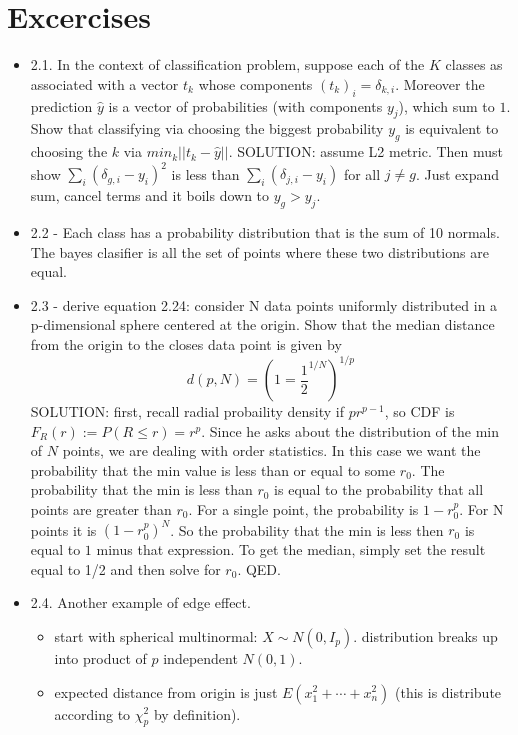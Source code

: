 \documentclass[a4paper]{report}
\newcommand{\<}{\textless}
\renewcommand{\>}{\textgreater}
\begin{document}
\section{Excercises}
\begin{itemize}
  \item 2.1. In the context of classification problem, suppose each of the $K$ classes as associated with a vector $t_k$ whose components $(t_k)_i = \delta_{k,i}$. Moreover the prediction $\hat{y}$ is a vector of probabilities (with components $y_j$), which sum to $1$. Show that classifying via choosing the biggest probability $y_g$ is equivalent to choosing the $k$ via $min_k || t_k - \hat{y} ||$.
    \subitem SOLUTION: assume L2 metric. Then must show $\sum_i (\delta_{g,i} - y_i)^2$ is less than $\sum_i (\delta_{j,i} - y_i)$ for all $j \neq g$. Just expand sum, cancel terms and it boils down to $y_g > y_j$.
  \item 2.2 - Each class has a probability distribution that is the sum of 10 normals. The bayes clasifier is all the set of points where these two distributions are equal.
  \item 2.3 - derive equation 2.24: consider N data points uniformly distributed in a p-dimensional sphere centered at the origin. Show that the median distance from the origin to the closes data point is given by
    $$ d(p, N) = \left(1 = \frac{1}{2}^{1/N}\right)^{1/p} $$
    \subitem SOLUTION: first, recall radial probaility density if $pr^{p-1}$, so CDF is $F_R(r) := P(R \leq r) = r^p$. Since he asks about the distribution of the min of $N$ points, we are dealing with order statistics. In this case we want the probability that the min value is less than or equal to some $r_0$. 
    The probability that the min is less than $r_0$ is equal to the probability that all points are greater than $r_0$.
    For a single point, the probability is $1-r_0^p$. For N points it is $(1-r_0^p)^N$. 
    So the probability that the min is less then $r_0$ is equal to $1$ minus that expression. To get the median, simply set the result equal to 1/2 and then solve for $r_0$. QED.
  \item 2.4. Another example of edge effect.
    \begin{itemize}
      \item start with spherical multinormal: $X \sim N(0, I_p)$.  distribution breaks up into product of $p$ independent $N(0,1)$.
      \item expected distance from origin is just $E(x_1^2 + \cdots +x_n^2)$ (this is distribute according to $\chi_p^2$ by definition).

\end{itemize}
\end{itemize}
\end{document}
